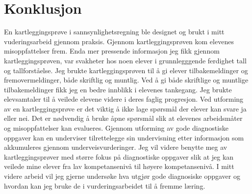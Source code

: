 \documentclass[main.tex]{subfiles}
\begin{document}
\section*{Konklusjon}
\label{sec:6}
En kartleggingsprøve i sannsynlighetsregning ble designet og brukt i mitt vuderingsarbeid
gjennom praksis. Gjennom kartleggingsprøven kom elevenes misoppfattelser frem. Enda mer pressende 
informasjon jeg fikk gjennom kartleggingsprøven, var svakheter hos noen elever i grunnlegggende 
ferdighet tall og tallforståelse. Jeg brukte kartleggingsprøven til å gi elever tilbakemeldinger 
og fremovermeldinger, både skriftlig og muntlig. Ved å gi både skriftlige og muntlige 
tilbakemeldinger fikk jeg en bedre innblikk i elevenes tankegang. Jeg brukte elevsamtaler til å 
veilede elevene videre i deres faglig progresjon. Ved utforming av en kartleggingsprøve er det 
viktig å ikke lage spørsmål der elever kan svare ja eller nei. Det er nødvendig å bruke åpne 
spørsmål slik at elevenes arbeidsmåter og misoppfattelser kan evalueres. Gjennom utforming av 
gode diagnostiske oppgaver kan en underviser tilrettelegge sin undervisning etter informasjon 
som akkumuleres gjennom underveisvurderinger. Jeg vil videre benytte meg av kartleggingsprøver 
med større fokus på diagnostiske oppgaver slik at jeg kan veilede mine elever fra lav 
kompetansenivå til høyere kompetansenivå. I mitt videre arbeid vil jeg gjerne undersøke hva 
utgjør gode diagnosiske oppgaver og hvordan kan jeg bruke de i vurderingsarbeidet til å fremme 
læring.
\end{document}
